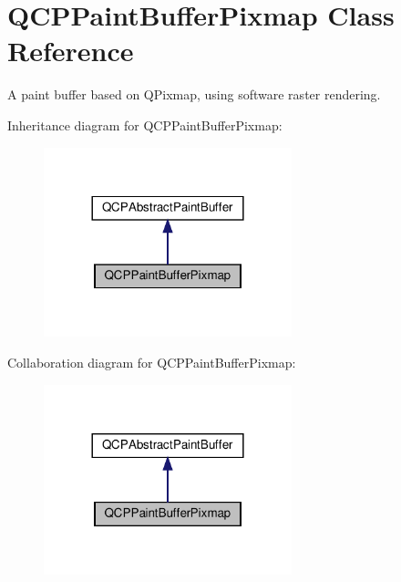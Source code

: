 \hypertarget{classQCPPaintBufferPixmap}{}\section{Q\+C\+P\+Paint\+Buffer\+Pixmap Class Reference}
\label{classQCPPaintBufferPixmap}


A paint buffer based on Q\+Pixmap, using software raster rendering.  




Inheritance diagram for Q\+C\+P\+Paint\+Buffer\+Pixmap\+:\nopagebreak
\begin{figure}[H]
\begin{center}
\leavevmode
\includegraphics[width=204pt]{classQCPPaintBufferPixmap__inherit__graph}
\end{center}
\end{figure}


Collaboration diagram for Q\+C\+P\+Paint\+Buffer\+Pixmap\+:\nopagebreak
\begin{figure}[H]
\begin{center}
\leavevmode
\includegraphics[width=204pt]{classQCPPaintBufferPixmap__coll__graph}
\end{center}
\end{figure}
